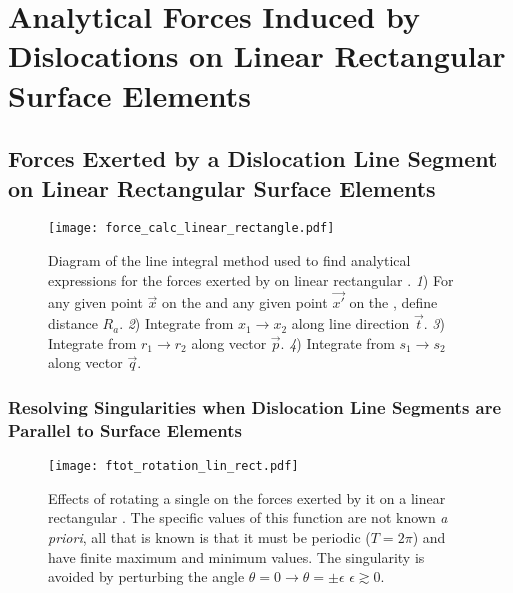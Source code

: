 \chapter{Analytical Forces Induced by Dislocations on Linear Rectangular Surface Elements}
\label{c:lin_rect}
	\section{Forces Exerted by a Dislocation Line Segment on Linear Rectangular Surface Elements}
	\label{s:f_lin_rect}
		\begin{figure}
			\centering
			\texttt{[image: force\_calc\_linear\_rectangle.pdf]}
			\caption[Diagram of the analytical force calculation on linear rectangular surface elements.]{Diagram of the line integral method used to find analytical expressions for the forces exerted by  on linear rectangular  \cite{analytical_integration_of_the_forces_induced_by_dislocations_on_a_surface_element}.
				\textit{1}) For any given point $ \vec{x} $ on the  and any given point $ \vec{x'}$ on the , define distance $ R_{a} $.
				\textit{2}) Integrate from $ x_{1} \to x_{2} $ along line direction $ \vec{t} $.
				\textit{3}) Integrate from $ r_{1} \to r_{2} $ along vector $ \vec{p} $.
				\textit{4}) Integrate from $ s_{1} \to s_{2} $ along vector $ \vec{q} $.}
			\label{f:flrs}
		\end{figure}
		\subsection{Resolving Singularities when Dislocation Line Segments are Parallel to Surface Elements}
		\label{ss:par_dln_se}
			\begin{figure}
				\centering
				\texttt{[image: ftot\_rotation\_lin\_rect.pdf]}
				\caption[Avoiding singularities by rotating dislocation line segments.]{Effects of rotating a single  on the forces exerted by it on a linear rectangular . The specific values of this function are not known \emph{a priori}, all that is known is that it must be periodic ($ T = 2\pi$) and have finite maximum and minimum values. The singularity is avoided by perturbing the angle $ \theta = 0 \to \theta = \pm \epsilon\,\, \epsilon \gtrsim 0 $.}
				\label{f:rflrs}
			\end{figure}
\savearabiccounter